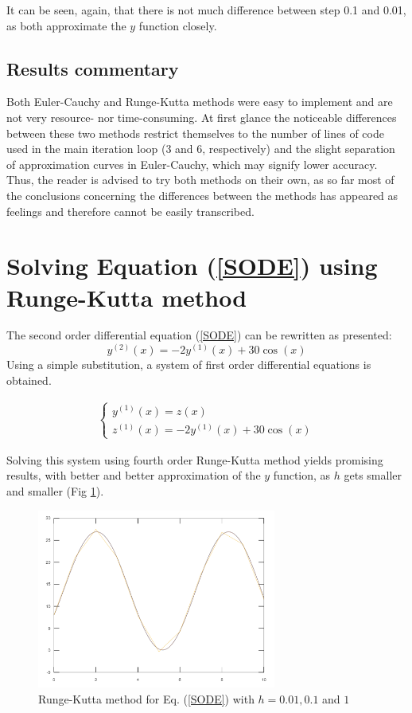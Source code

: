 \documentclass[a4paper,12pt]{article}
\begin{document}
It can be seen, again, that there is not much difference between step 0.1 and 0.01, as both approximate the $y$ function closely.

\subsection{Results commentary}

Both Euler-Cauchy and Runge-Kutta methods were easy to implement and are not very resource- nor time-consuming. At first glance the noticeable differences between these two methods restrict themselves to the number of lines of code used in the main iteration loop (3 and 6, respectively) and the slight separation of approximation curves in Euler-Cauchy, which may signify lower accuracy. Thus, the reader is advised to try both methods on their own, as so far most of the conclusions concerning the differences between the methods has appeared as feelings and therefore cannot be easily transcribed.

\section{Solving Equation (\ref{SODE}) using Runge-Kutta method}
The second order differential equation (\ref{SODE}) can be rewritten as presented:
\begin{equation}
    y^{(2)}(x) = -2y^{(1)}(x) + 30\cos(x)
\end{equation}
\clearpage
Using a simple substitution, a system of first order differential equations is obtained.

\begin{gather}
    \begin{cases}
    y^{(1)}(x) = z(x) \\ z^{(1)}(x) = -2y^{(1)}(x) + 30\cos(x)
    \end{cases}
\end{gather}

Solving this system using fourth order Runge-Kutta method yields promising results, with better and better approximation of the $y$ function, as $h$ gets smaller and smaller (Fig \ref{fig:runge_kutta_sode}).

\begin{figure}[H]
    \centering
    \includegraphics[width=0.7\textwidth]{runge_kutta_sode.png}
    \caption{Runge-Kutta method for Eq. (\ref{SODE}) with $h = 0.01, 0.1$ and $1$}
    \label{fig:runge_kutta_sode}
\end{figure}
\end{document}
